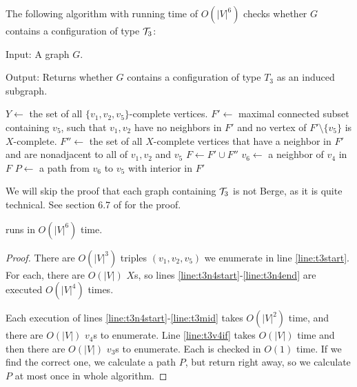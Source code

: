 The following algorithm with running time of $O(|V|^6)$ checks whether $G$ contains a configuration of type $\mathcal{T}_3$:

\begin{alg}
	\label{alg:t3}
	Input: A graph $G$.

	\noindent Output: Returns whether $G$ contains a configuration of type $T_3$ as an induced subgraph.
\end{alg}

\begin{algorithmic}[1]
		\ls $Y \gets$ the set of all $\{v_1, v_2, v_5\}$-complete vertices.
			\ls $F' \gets$ maximal connected subset containing $v_5$, such that $v_1, v_2$ \label{line:t3n4start}
			\lsx have no neighbors in $F'$ and no vertex of $F'\setminus\{v_5\}$ is $X$-complete.
			\ls $F'' \gets$ the set of all $X$-complete vertices that have a neighbor in 
			\lsx $F'$ and are nonadjacent to all of $v_1, v_2$ and $v_5$
			\ls $F \gets F' \cup F''$ \label{line:t3mid}
					\ls $v_6 \gets$ a neighbor of $v_4$ in $F$
							\ls $P \gets$ a path from $v_6$ to $v_5$ with interior in $F'$
							\ls \RETURN \TRUE {}
						\mEndIf
					\mEndFor
				\mEndIf
			\mEndFor \label{line:t3n4end}
		\mEndFor
	\mEndFor
	\ls \RETURN \FALSE
	\mEndProcedure
\end{algorithmic}

We will skip the proof that each graph containing $\mathcal{T}_3$ is not Berge, as it is quite technical. See section 6.7 of \cite{MC05} for the proof.

\begin{theorem}
	 runs in $O(|V|^6)$ time.
\end{theorem}
\begin{proof}
	There are $O(|V|^3)$ triples $(v_1, v_2, v_5)$ we enumerate in line \ref{line:t3start}. For each, there are $O(|V|)$ $X$s, so lines \ref{line:t3n4start}-\ref{line:t3n4end} are executed $O(|V|^4)$ times.

	Each execution of lines \ref{line:t3n4start}-\ref{line:t3mid} takes $O(|V|^2)$ time, and there are $O(|V|)$ $v_4$s to enumerate. Line \ref{line:t3v4if} takes $O(|V|)$ time and then there are $O(|V|)$ $v_3$s to enumerate. Each is checked in $O(1)$ time. If we find the correct one, we calculate a path $P$, but return right away, so we calculate $P$ at most once in whole algorithm.
\end{proof}

